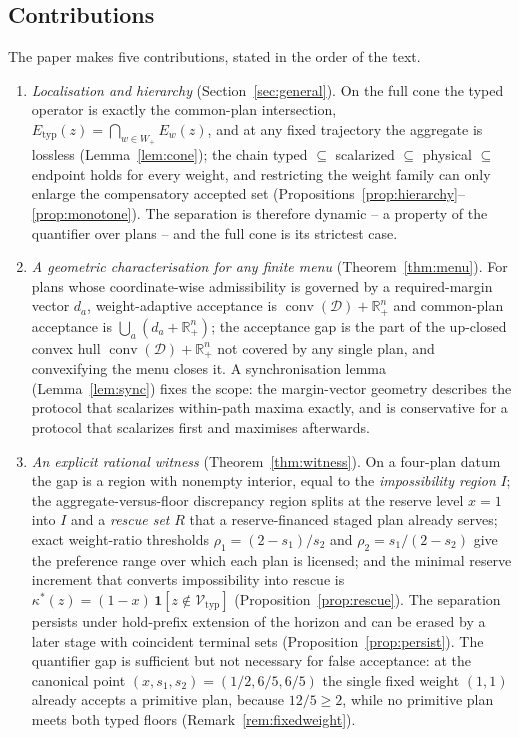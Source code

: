 \documentclass[preprint,11pt,authoryear]{elsarticle}
\theoremstyle{definition}
\theoremstyle{remark}
\newcommand{\Etyp}{E_{\mathrm{typ}}}
\newcommand{\Vtyp}{\mathcal{V}_{\mathrm{typ}}}
\newcommand{\Wp}{W_+}
\newcommand{\conv}{\operatorname{conv}}
\newcommand{\Rp}{\mathbb{R}^n_+}
\begin{document}
\subsection{Contributions}

The paper makes five contributions, stated in the order of the text.
\begin{enumerate}[leftmargin=2em,label=(\roman*)]
\item \emph{Localisation and hierarchy} (Section~\ref{sec:general}). On the full cone the typed operator is exactly the common-plan intersection, $\Etyp(z)=\bigcap_{w\in\Wp}E_w(z)$, and at any fixed trajectory the aggregate is lossless (Lemma~\ref{lem:cone}); the chain typed $\subseteq$ scalarized $\subseteq$ physical $\subseteq$ endpoint holds for every weight, and restricting the weight family can only enlarge the compensatory accepted set (Propositions~\ref{prop:hierarchy}--\ref{prop:monotone}). The separation is therefore dynamic -- a property of the quantifier over plans -- and the full cone is its strictest case.
\item \emph{A geometric characterisation for any finite menu} (Theorem~\ref{thm:menu}). For plans whose coordinate-wise admissibility is governed by a required-margin vector $d_a$, weight-adaptive acceptance is $\conv(\mathcal D)+\Rp$ and common-plan acceptance is $\bigcup_a(d_a+\Rp)$; the acceptance gap is the part of the up-closed convex hull $\conv(\mathcal D)+\Rp$ not covered by any single plan, and convexifying the menu closes it. A synchronisation lemma (Lemma~\ref{lem:sync}) fixes the scope: the margin-vector geometry describes the protocol that scalarizes within-path maxima exactly, and is conservative for a protocol that scalarizes first and maximises afterwards.
\item \emph{An explicit rational witness} (Theorem~\ref{thm:witness}). On a four-plan datum the gap is a region with nonempty interior, equal to the \emph{impossibility region} $I$; the aggregate-versus-floor discrepancy region splits at the reserve level $x=1$ into $I$ and a \emph{rescue set} $R$ that a reserve-financed staged plan already serves; exact weight-ratio thresholds $\rho_1=(2-s_1)/s_2$ and $\rho_2=s_1/(2-s_2)$ give the preference range over which each plan is licensed; and the minimal reserve increment that converts impossibility into rescue is $\kappa^*(z)=(1-x)\,\mathbf 1[z\notin\Vtyp]$ (Proposition~\ref{prop:rescue}). The separation persists under hold-prefix extension of the horizon and can be erased by a later stage with coincident terminal sets (Proposition~\ref{prop:persist}). The quantifier gap is sufficient but not necessary for false acceptance: at the canonical point $(x,s_1,s_2)=(1/2,6/5,6/5)$ the single fixed weight $(1,1)$ already accepts a primitive plan, because $12/5\ge2$, while no primitive plan meets both typed floors (Remark~\ref{rem:fixedweight}).

\end{enumerate}
\end{document}
